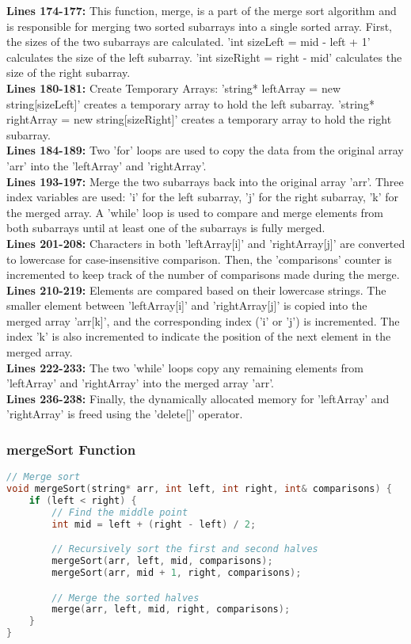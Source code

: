 \documentclass[letterpaper, 10pt,DIV=13]{scrartcl}
\numberwithin{equation}{section} %
\numberwithin{figure}{section} %
\numberwithin{table}{section} %
\begin{document}
\textbf{Lines 174-177:} This function, merge, is a part of the merge sort algorithm and is responsible for merging two sorted subarrays into a single sorted array. First, the sizes of the two subarrays are calculated. 'int sizeLeft = mid - left + 1' calculates the size of the left subarray. 'int sizeRight = right - mid' calculates the size of the right subarray. \\
\textbf{Lines 180-181:} Create Temporary Arrays: 'string* leftArray = new string[sizeLeft]' creates a temporary array to hold the left subarray. 'string* rightArray = new string[sizeRight]' creates a temporary array to hold the right subarray. \\
\textbf{Lines 184-189:} Two 'for' loops are used to copy the data from the original array 'arr' into the 'leftArray' and 'rightArray'.  \\
\textbf{Lines 193-197:} Merge the two subarrays back into the original array 'arr'. Three index variables are used: 'i' for the left subarray, 'j' for the right subarray, 'k' for the merged array. A 'while' loop is used to compare and merge elements from both subarrays until at least one of the subarrays is fully merged. \\
\textbf{Lines 201-208:} Characters in both 'leftArray[i]' and 'rightArray[j]' are converted to lowercase for case-insensitive comparison. Then, the 'comparisons' counter is incremented to keep track of the number of comparisons made during the merge. \\
\textbf{Lines 210-219:} Elements are compared based on their lowercase strings. The smaller element between 'leftArray[i]' and 'rightArray[j]' is copied into the merged array 'arr[k]', and the corresponding index ('i' or 'j') is incremented. The index 'k' is also incremented to indicate the position of the next element in the merged array. \\
\textbf{Lines 222-233:} The two 'while' loops copy any remaining elements from 'leftArray' and 'rightArray' into the merged array 'arr'. \\
\textbf{Lines 236-238:} Finally, the dynamically allocated memory for 'leftArray' and 'rightArray' is freed using the 'delete[]' operator.

\subsubsection{mergeSort Function}
\begin{linenumbers}
\begin{lstlisting}[language=C++, caption={mergeSort Function}, label={code:example}]
// Merge sort 
void mergeSort(string* arr, int left, int right, int& comparisons) {
    if (left < right) {
        // Find the middle point
        int mid = left + (right - left) / 2;

        // Recursively sort the first and second halves
        mergeSort(arr, left, mid, comparisons);
        mergeSort(arr, mid + 1, right, comparisons);

        // Merge the sorted halves
        merge(arr, left, mid, right, comparisons);
    }
}
\end{lstlisting}
\end{linenumbers}
\nolinenumbers
\end{document}
